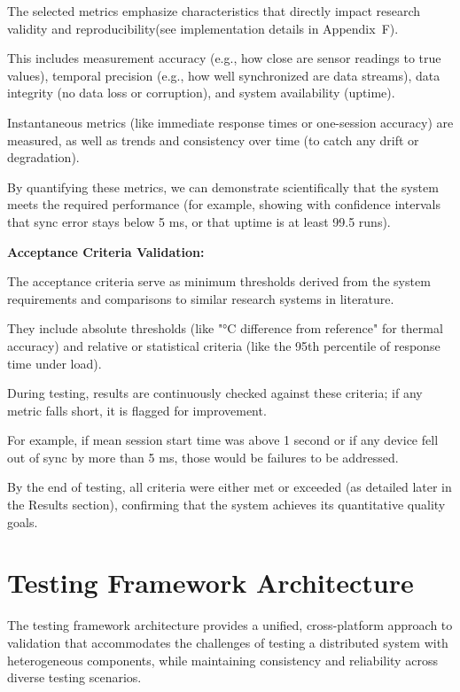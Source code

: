 {{The selected metrics emphasize characteristics that directly impact research
validity and reproducibility(see implementation details in Appendix~F).

This includes measurement accuracy (e.g., how close are sensor readings to true
values), temporal precision (e.g., how well synchronized are data streams), data
integrity (no data loss or corruption), and system availability (uptime).

Instantaneous metrics (like immediate response times or one-session accuracy)
are measured, as well as trends and consistency over time (to catch any drift or
degradation).

By quantifying these metrics, we can demonstrate scientifically that the system
meets the required performance (for example, showing with confidence intervals
that sync error stays below 5 ms, or that uptime is at least 99.5%
runs).

\textbf{Acceptance Criteria Validation:}

The acceptance criteria serve as minimum thresholds derived from the system
requirements and comparisons to similar research systems in literature.

They include absolute thresholds (like "°C difference from reference" for
thermal accuracy) and relative or statistical criteria (like the 95th percentile
of response time under load).

During testing, results are continuously checked against these criteria; if any
metric falls short, it is flagged for improvement.

For example, if mean session start time was above 1 second or if any device fell
out of sync by more than 5 ms, those would be failures to be addressed.

By the end of testing, all criteria were either met or exceeded (as detailed
later in the Results section), confirming that the system achieves its
quantitative quality goals.

\section{Testing Framework Architecture}

The testing framework architecture provides a unified, cross-platform approach
to validation that accommodates the challenges of testing a distributed system
with heterogeneous components, while maintaining consistency and reliability
across diverse testing scenarios.

}}
